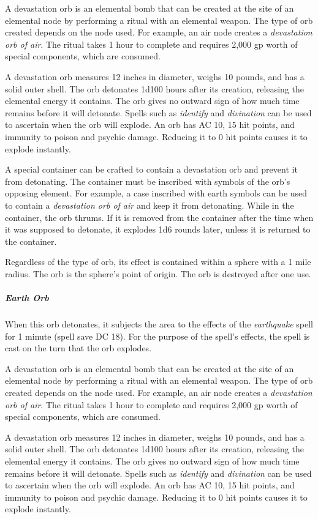 \documentclass[10pt,a4paper,twoside,bg=print,twocolumn,openany,nodeprecatedcode]{dndbook}
\begin{document}
A devastation orb is an elemental bomb that can be created at the site of an elemental node by performing a ritual with an elemental weapon. The type of orb created depends on the node used. For example, an air node creates a \textit{devastation orb of air}. The ritual takes 1 hour to complete and requires 2,000 gp worth of special components, which are consumed.

A devastation orb measures 12 inches in diameter, weighs 10 pounds, and has a solid outer shell. The orb detonates 1d100 hours after its creation, releasing the elemental energy it contains. The orb gives no outward sign of how much time remains before it will detonate. Spells such as \textit{identify} and \textit{divination} can be used to ascertain when the orb will explode. An orb has AC 10, 15 hit points, and immunity to poison and psychic damage. Reducing it to 0 hit points causes it to explode instantly.

A special container can be crafted to contain a devastation orb and prevent it from detonating. The container must be inscribed with symbols of the orb's opposing element. For example, a case inscribed with earth symbols can be used to contain a \textit{devastation orb of air} and keep it from detonating. While in the container, the orb thrums. If it is removed from the container after the time when it was supposed to detonate, it explodes 1d6 rounds later, unless it is returned to the container.

Regardless of the type of orb, its effect is contained within a sphere with a 1 mile radius. The orb is the sphere's point of origin. The orb is destroyed after one use.

\subparagraph{Earth Orb}
When this orb detonates, it subjects the area to the effects of the \textit{earthquake} spell for 1 minute (spell save DC 18). For the purpose of the spell's effects, the spell is cast on the turn that the orb explodes.

A devastation orb is an elemental bomb that can be created at the site of an elemental node by performing a ritual with an elemental weapon. The type of orb created depends on the node used. For example, an air node creates a \textit{devastation orb of air}. The ritual takes 1 hour to complete and requires 2,000 gp worth of special components, which are consumed.

A devastation orb measures 12 inches in diameter, weighs 10 pounds, and has a solid outer shell. The orb detonates 1d100 hours after its creation, releasing the elemental energy it contains. The orb gives no outward sign of how much time remains before it will detonate. Spells such as \textit{identify} and \textit{divination} can be used to ascertain when the orb will explode. An orb has AC 10, 15 hit points, and immunity to poison and psychic damage. Reducing it to 0 hit points causes it to explode instantly.
\end{document}
